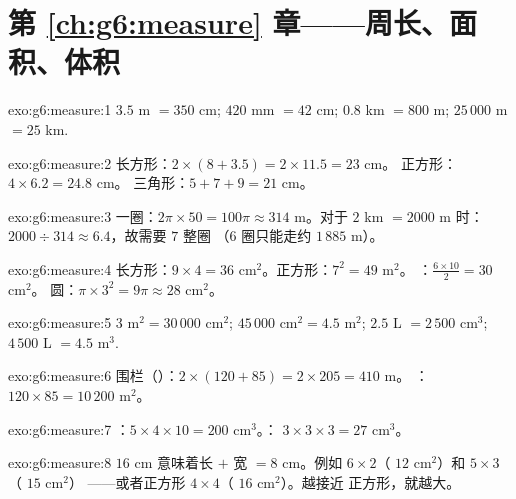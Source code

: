 \section*{第 \ref{ch:g6:measure} 章——周长、面积、体积}

\begin{solution}{exo:g6:measure:1}
$3.5$ m $= 350$ cm; \quad $420$ mm $= 42$ cm; \quad
$0.8$ km $= 800$ m; \quad $25\,000$ m $= 25$ km.
\end{solution}

\begin{solution}{exo:g6:measure:2}
长方形：$2 \times (8 + 3.5) = 2 \times 11.5 = 23$ cm。
正方形：$4 \times 6.2 = 24.8$ cm。
三角形：$5 + 7 + 9 = 21$ cm。
\end{solution}

\begin{solution}{exo:g6:measure:3}
一圈：$2\pi \times 50 = 100\pi \approx 314$ m。对于 $2$ km
$= 2000$ m 时：$2000 \div 314 \approx 6.4$，故需要 $7$ 整圈
（$6$ 圈只能走约 $1\,885$ m）。
\end{solution}

\begin{solution}{exo:g6:measure:4}
长方形：$9 \times 4 = 36$ cm$^2$。正方形：$7^2 = 49$ m$^2$。
：$\frac{6 \times 10}{2} = 30$ cm$^2$。
圆：$\pi \times 3^2 = 9\pi \approx 28$ cm$^2$。
\end{solution}

\begin{solution}{exo:g6:measure:5}
$3$ m$^2 = 30\,000$ cm$^2$; \quad
$45\,000$ cm$^2 = 4.5$ m$^2$; \quad
$2.5$ L $= 2\,500$ cm$^3$; \quad
$4\,500$ L $= 4.5$ m$^3$.
\end{solution}

\begin{solution}{exo:g6:measure:6}
围栏（）：$2 \times (120 + 85) = 2 \times 205 = 410$ m。
：$120 \times 85 = 10\,200$ m$^2$。
\end{solution}

\begin{solution}{exo:g6:measure:7}
：$5 \times 4 \times 10 = 200$ cm$^3$。：
$3 \times 3 \times 3 = 27$ cm$^3$。
\end{solution}

\begin{solution}{exo:g6:measure:8}
 $16$ cm 意味着长 $+$ 宽 $= 8$ cm。例如
$6 \times 2$（ $12$ cm$^2$）和 $5 \times 3$（ $15$ cm$^2$）
——或者正方形 $4 \times 4$（ $16$ cm$^2$）。越接近
正方形，就越大。
\end{solution}

